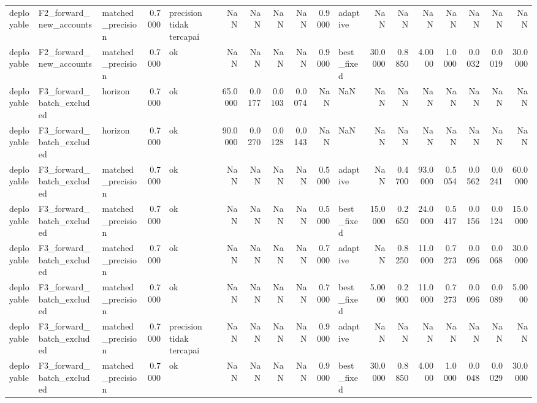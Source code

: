 \begin{table}
\begin{tabular}{lllrlrrrrrlrrrrrrr}
deployable & F2\_forward\_new\_accounts & matched\_precision & 0.7000 & precision tidak tercapai & NaN & NaN & NaN & NaN & 0.9000 & adaptive & NaN & NaN & NaN & NaN & NaN & NaN & NaN \\
deployable & F2\_forward\_new\_accounts & matched\_precision & 0.7000 & ok & NaN & NaN & NaN & NaN & 0.9000 & best\_fixed & 30.0000 & 0.8850 & 4.0000 & 1.0000 & 0.0032 & 0.0019 & 30.0000 \\
deployable & F3\_forward\_batch\_excluded & horizon & 0.7000 & ok & 65.0000 & 0.0177 & 0.0103 & 0.0074 & NaN & NaN & NaN & NaN & NaN & NaN & NaN & NaN & NaN \\
deployable & F3\_forward\_batch\_excluded & horizon & 0.7000 & ok & 90.0000 & 0.0270 & 0.0128 & 0.0143 & NaN & NaN & NaN & NaN & NaN & NaN & NaN & NaN & NaN \\
deployable & F3\_forward\_batch\_excluded & matched\_precision & 0.7000 & ok & NaN & NaN & NaN & NaN & 0.5000 & adaptive & NaN & 0.4700 & 93.0000 & 0.5054 & 0.0562 & 0.0241 & 60.0000 \\
deployable & F3\_forward\_batch\_excluded & matched\_precision & 0.7000 & ok & NaN & NaN & NaN & NaN & 0.5000 & best\_fixed & 15.0000 & 0.2650 & 24.0000 & 0.5417 & 0.0156 & 0.0124 & 15.0000 \\
deployable & F3\_forward\_batch\_excluded & matched\_precision & 0.7000 & ok & NaN & NaN & NaN & NaN & 0.7000 & adaptive & NaN & 0.8250 & 11.0000 & 0.7273 & 0.0096 & 0.0068 & 30.0000 \\
deployable & F3\_forward\_batch\_excluded & matched\_precision & 0.7000 & ok & NaN & NaN & NaN & NaN & 0.7000 & best\_fixed & 5.0000 & 0.2900 & 11.0000 & 0.7273 & 0.0096 & 0.0089 & 5.0000 \\
deployable & F3\_forward\_batch\_excluded & matched\_precision & 0.7000 & precision tidak tercapai & NaN & NaN & NaN & NaN & 0.9000 & adaptive & NaN & NaN & NaN & NaN & NaN & NaN & NaN \\
deployable & F3\_forward\_batch\_excluded & matched\_precision & 0.7000 & ok & NaN & NaN & NaN & NaN & 0.9000 & best\_fixed & 30.0000 & 0.8850 & 4.0000 & 1.0000 & 0.0048 & 0.0029 & 30.0000 \\
\bottomrule
\end{tabular}
\end{table}

